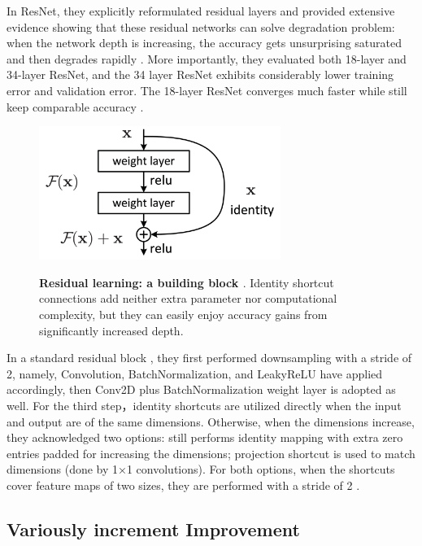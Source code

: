 In ResNet\cite{20}, they explicitly reformulated residual layers and provided extensive evidence showing that these residual networks can solve degradation problem: when the network depth is increasing, the accuracy gets unsurprising saturated and then degrades rapidly \cite{20}.
More importantly, they evaluated both 18-layer and 34-layer ResNet, and the 34 layer ResNet exhibits considerably lower training error and validation error. The 18-layer ResNet converges much faster while still keep comparable accuracy \cite{20}. 

\begin{figure}[t]
\begin{center}
\centering
\includegraphics[width=0.7\textwidth]{thesis-template-master/images/RES.png}
\label{fig:cellnet}
\end{center}
\caption{\textbf{Residual learning: a building block \cite{20}}. Identity shortcut connections add neither extra parameter nor computational complexity, but they can easily enjoy accuracy gains from significantly increased depth.}
\label{fig:2.5}
\end{figure}

In a standard residual block \cite{20}, they first performed downsampling with a stride of 2, namely, Convolution, BatchNormalization, and  LeakyReLU have applied accordingly, then Conv2D plus BatchNormalization weight layer is adopted as well. For the third step，identity shortcuts are utilized directly when the input and output are of the same dimensions. Otherwise, when the dimensions increase, they acknowledged two options:  still performs identity mapping with extra zero entries padded for increasing the dimensions; projection shortcut is used to match dimensions (done by 1×1 convolutions). For both options, when the shortcuts cover feature maps of two sizes, they are performed with a stride of 2 \cite{20}.


\subsection{ Variously increment Improvement }

